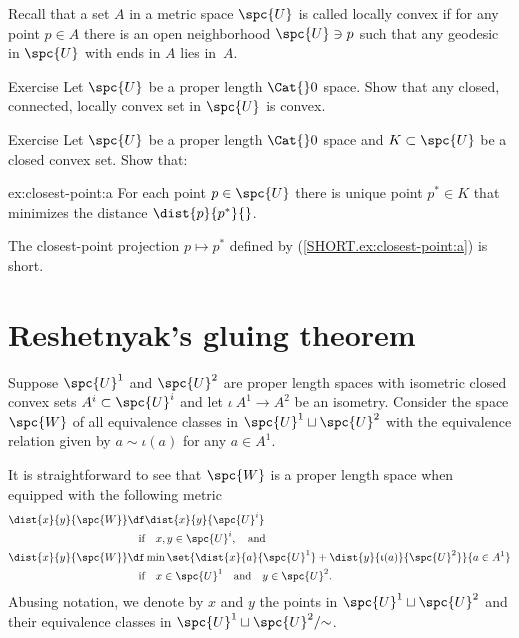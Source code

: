 Recall that a set $A$ in a metric space $\spc{U}$ is called locally convex if for any point $p\in A$ there is an open neighborhood $\spc{U}\ni p$ such that any geodesic in $\spc{U}$ with  ends in $A$ lies in~$A$. 

\begin{thm}{Exercise}\label{ex:locally-convex}
Let $\spc{U}$ be a proper length $\Cat{}0$ space.
Show that any closed, connected, locally convex set in $\spc{U}$ is convex.
\end{thm}

\begin{thm}{Exercise}\label{ex:closest-point}
Let  $\spc{U}$ be a proper length $\Cat{}0$ space 
and $K\subset \spc{U}$ be a closed convex set.
Show that: 

\begin{subthm}{ex:closest-point:a}
For each point $p\in \spc{U}$ there is unique point $p^*\in K$ that minimizes the distance $\dist{p}{p^*}{}$.
\end{subthm}

\begin{subthm}{}
The closest-point projection $p\mapsto p^*$ defined by (\ref{SHORT.ex:closest-point:a}) is short. 
\end{subthm}

\end{thm}


\section{Reshetnyak's gluing theorem}\label{sec:cba-gluing}

Suppose 
$\spc{U}^1$ and $\spc{U}^2$ are proper length spaces 
with isometric closed convex sets $A^i\subset\spc{U}^i$ and let $\iota\:A^1\to A^2$ be an isometry.
Consider the space $\spc{W}$ of all equivalence classes in $\spc{U}^1\sqcup\spc{U}^2$ with the equivalence relation given by $a\sim\iota(a)$ for any $a\in A^1$.

It is straightforward to see that $\spc{W}$ is a proper length space when equipped with the following metric
\begin{align*}
\dist{x}{y}{\spc{W}}&\df\dist{x}{y}{\spc{U}^i}
\\
&\quad\text{if}\quad x,y\in \spc{U}^i,\quad\text{and}
\\
\dist{x}{y}{\spc{W}}&\df\min\set{\dist{x}{a}{\spc{U}^1}+\dist{y}{\iota(a)}{\spc{U}^2}}{a\in A^1}
\\
&\quad\text{if}\quad x\in \spc{U}^1\quad\text{and}\quad y\in \spc{U}^2.
\end{align*}
Abusing notation, we denote by $x$ and $y$ the points in $\spc{U}^1\sqcup\spc{U}^2$ and their equivalence classes in $\spc{U}^1\sqcup\spc{U}^2/{{\sim}}$.

